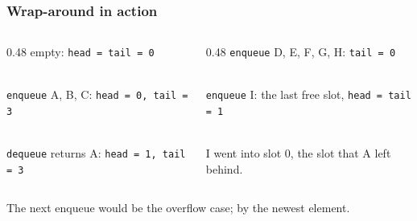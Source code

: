 \documentclass[aspectratio=169,10pt,compress]{beamer}
\begin{document}
\begin{frame}[t,fragile] \frametitle{Wrap-around in action}
  \begin{columns}[T]
    \begin{column}{0.48\textwidth}
      \small empty: \texttt{head = tail = 0}\\
      \\[0.2em]
      \texttt{enqueue} A, B, C: \texttt{head = 0, tail = 3}\\
      \\[0.2em]
      \texttt{dequeue} returns A: \texttt{head = 1, tail = 3}\\
    \end{column}
    \begin{column}{0.48\textwidth}
      \small \texttt{enqueue} D, E, F, G, H: \texttt{tail = 0}\\
      \\[0.2em]
      \texttt{enqueue} I: the last free slot, \texttt{head = tail = 1}\\
      \\[0.2em]
      \scriptsize I went into slot 0, the slot that A left behind.
    \end{column}
  \end{columns}
  \vspace{0.2em}
  \small The next enqueue would be the overflow case;  by the newest element.
\end{frame}
\end{document}
